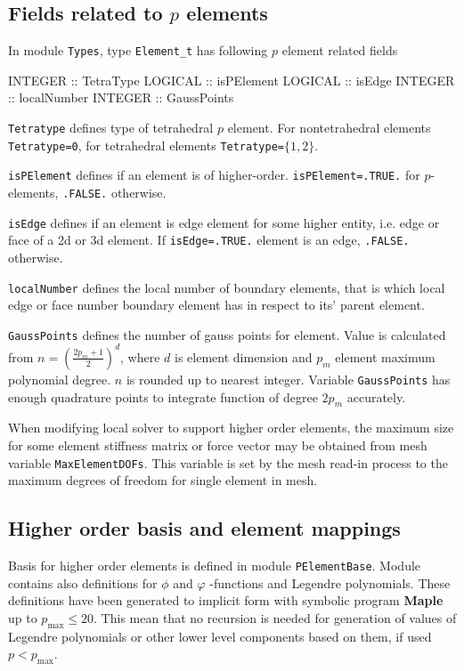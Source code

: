 \subsection{Fields related to $p$ elements}

In module \texttt{Types}, type \texttt{Element\_t} has following $p$ element related fields

\ttbegin
INTEGER :: TetraType
LOGICAL :: isPElement
LOGICAL :: isEdge
INTEGER :: localNumber
INTEGER :: GaussPoints 
\ttend

\texttt{Tetratype} defines type of tetrahedral $p$ element. For nontetrahedral elements \texttt{Tetratype=0}, for tetrahedral elements \texttt{Tetratype=}$\{1,2\}$. 

\texttt{isPElement} defines if an element is of higher-order. \texttt{isPElement=.TRUE.} for $p$-elements, \texttt{.FALSE.} otherwise.

\texttt{isEdge} defines if an element is edge element for some higher entity, i.e. edge or face of a 2d or 3d element. If \texttt{isEdge=.TRUE.} element is an edge, \texttt{.FALSE.} otherwise.

\texttt{localNumber} defines the local number of boundary elements, that is which local edge or face number boundary element has in respect to its' parent element. 

\texttt{GaussPoints} defines the number of gauss points for element. Value is calculated from $n=(\frac{2p_m+1}{2})^d$, where $d$ is element dimension and $p_m$ element maximum polynomial degree. $n$ is rounded up to nearest integer. Variable \texttt{GaussPoints} has enough quadrature points to integrate function of degree $2p_m$ accurately. 

When modifying local solver to support higher order elements, the maximum size for some element stiffness matrix or force vector may be obtained from mesh variable \texttt{MaxElementDOFs}. This variable is set by the mesh read-in process to the maximum degrees of freedom for single element in mesh.  

\subsection{Higher order basis and element mappings}

Basis for higher order elements is defined in module \texttt{PElementBase}. Module contains also definitions for $\phi$ and $\varphi$ -functions and Legendre polynomials. These definitions have been generated to implicit form with symbolic program \textbf{Maple} \cite{Maple} up to $p_{\max}\leq 20$. This mean that no recursion is needed for generation of values of Legendre polynomials or other lower level components based on them, if used $p<p_{\max}$. 

